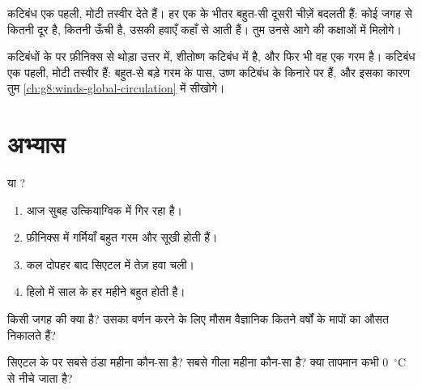 कटिबंध एक पहली, मोटी तस्वीर देते हैं। हर एक के भीतर बहुत-सी दूसरी चीज़ें 
बदलती हैं: कोई जगह  से कितनी दूर है, कितनी ऊँची है, उसकी हवाएँ कहाँ से आती
हैं। तुम उनसे आगे की कक्षाओं में मिलोगे।

\begin{remark}[फ़ीनिक्स और कटिबंध]\label{rem:g5:weather-and-climate:phoenix}
कटिबंधों के  पर फ़ीनिक्स  से थोड़ा उत्तर में, शीतोष्ण कटिबंध में
है, और फिर भी वह एक गरम  है। कटिबंध एक पहली, मोटी तस्वीर हैं: बहुत-से
बड़े गरम   के पास, उष्ण कटिबंध के किनारे पर हैं, और इसका कारण
तुम \cref{ch:g8:winds-global-circulation} में
सीखोगे।
\end{remark}

\section{अभ्यास}

\begin{exercise}[$\star$]\label{exo:g5:weather-and-climate:1}
 या ?
\begin{enumerate}
  \item[(क)] आज सुबह उत्कियाग्विक में  गिर रहा है।
  \item[(ख)] फ़ीनिक्स में गर्मियाँ बहुत गरम और सूखी होती हैं।
  \item[(ग)] कल दोपहर बाद सिएटल में तेज़ हवा चली।
  \item[(घ)] हिलो में साल के हर महीने बहुत  होती है।
\end{enumerate}
\end{exercise}

\begin{exercise}[$\star$]\label{exo:g5:weather-and-climate:2}
किसी जगह की  क्या है? उसका वर्णन करने के लिए मौसम वैज्ञानिक कितने वर्षों के
मापों का औसत निकालते हैं?
\end{exercise}

\begin{exercise}[$\star$]\label{exo:g5:weather-and-climate:3}
सिएटल के  पर सबसे ठंडा महीना कौन-सा है? सबसे गीला महीना कौन-सा है? क्या
तापमान कभी 0~$^\circ$C से नीचे जाता है?
\end{exercise}


